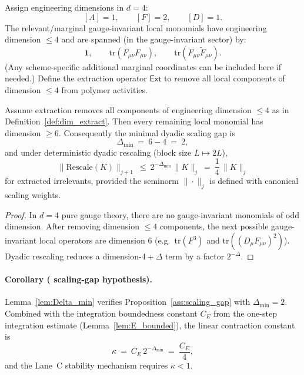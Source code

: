 \begin{definition}\label{def:dim_extract}
Assign engineering dimensions in $d=4$:
\[
[A]=1,\qquad [F]=2,\qquad [D]=1.
\]
The relevant/marginal gauge-invariant local monomials have engineering dimension $\le 4$ and are spanned (in the gauge-invariant sector) by:
\[
\mathbf 1,\qquad \mathrm{tr}(F_{\mu\nu}F_{\mu\nu}),\qquad \mathrm{tr}(F_{\mu\nu}\widetilde F_{\mu\nu}).
\]
(Any scheme-specific additional marginal coordinates can be included here if needed.)
Define the extraction operator $\mathsf{Ext}$ to remove all local components of dimension $\le 4$ from polymer activities.
\end{definition}

\begin{lemma}\label{lem:Delta_min}
Assume extraction removes all components of engineering dimension $\le 4$ as in Definition~\ref{def:dim_extract}.
Then every remaining local monomial has dimension $\ge 6$.
Consequently the minimal dyadic scaling gap is
\[
\Delta_{\min}\ =\ 6-4\ =\ 2,
\]
and under deterministic dyadic rescaling (block size $L\mapsto 2L$),
\[
\|\mathrm{Rescale}(K)\|_{j+1}\ \le\ 2^{-\Delta_{\min}}\,\|K\|_j\ =\ \frac14\,\|K\|_j
\]
for extracted irrelevants, provided the seminorm $\|\cdot\|_j$ is defined with canonical scaling weights.
\end{lemma}

\begin{proof}
In $d=4$ pure gauge theory, there are no gauge-invariant monomials of odd dimension.
After removing dimension $\le 4$ components, the next possible gauge-invariant local operators are dimension $6$ (e.g.\ $\mathrm{tr}(F^3)$ and $\mathrm{tr}((D_\mu F_{\mu\nu})^2)$).
Dyadic rescaling reduces a dimension-$4+\Delta$ term by a factor $2^{-\Delta}$.
\end{proof}

\paragraph{Corollary ( scaling-gap hypothesis).}
Lemma~\ref{lem:Delta_min} verifies Proposition~\ref{ass:scaling_gap} with $\Delta_{\min}=2$.
Combined with the integration boundedness constant $C_E$ from the one-step integration estimate (Lemma~\ref{lem:E_bounded}),
the linear contraction constant is
\[
\kappa \ =\ C_E\,2^{-\Delta_{\min}}\ =\ \frac{C_E}{4},
\]
and the Lane~C stability mechanism requires $\kappa<1$.
